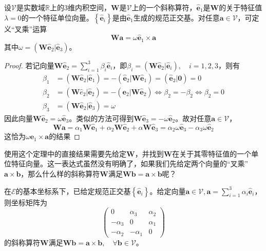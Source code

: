 \documentclass[main.tex]{subfiles}
\begin{document}
\begin{theorem}
    设$\mathcal{V}$是实数域$\mathbb{R}$上的3维内积空间，$\mathbf{W}$是$\mathcal{V}$上的一个斜称算符，$\mathbf{\hat{e}}_1$是$\mathbf{W}$的关于特征值$\lambda=0$的一个特征单位向量。$\left\{\mathbf{\hat{e}}_i\right\}$是由$\mathbf{\hat{e}}_1$生成的规范正交基。对任意$\mathbf{a}\in\mathcal{V}$，可定义“叉乘”运算
    \[\mathbf{Wa}=\omega\mathbf{\hat{e}}_1\times\mathbf{a}\]
    其中$\omega=\left(\mathbf{W\hat{e}}_2|\mathbf{\hat{e}}_3\right)$。
\end{theorem}
\begin{proof}
    若记向量$\mathbf{W\hat{e}}_2=\sum_{i=1}^3\beta_i\mathbf{\hat{e}}_i$，即$\beta_i=\left(\mathbf{W\hat{e}}_2|\mathbf{\hat{e}}_i\right),\quad i=1,2,3$，则有
    \begin{align*}
        \beta_1 & =\left(\mathbf{W\hat{e}}_2|\mathbf{\hat{e}}_1\right)=-\left(\mathbf{\hat{e}}_2|\mathbf{W\hat{e}}_1\right)=\left(\mathbf{\hat{e}}_2|\mathbf{0}\right)=0     \\
        \beta_2 & =\left(\mathbf{W}\hat{e}_2|\mathbf{\hat{e}}_2\right)=-\left(\mathbf{e}_2|\mathbf{W\hat{e}}_2\right)\Leftrightarrow\beta_2=-\beta_2\Leftrightarrow\beta_2=0 \\
        \beta_3 & =\left(\mathbf{W\hat{e}}_2|\mathbf{\hat{e}}_3\right)=\omega
    \end{align*}
    因此向量$\mathbf{W\hat{e}}_2=\omega\mathbf{\hat{e}}_3$。类似的方法可得到$\mathbf{W\hat{e}}_3=-\omega\mathbf{\hat{e}}_2$。故对任意$\mathbf{a}\in\mathcal{V}$，
    \[
        \mathbf{Wa}=\alpha_1\mathbf{W\hat{e}}_1+\alpha_2\mathbf{W\hat{e}}_2+\alpha\mathbf{W\hat{e}}_3=\alpha_2\omega\mathbf{\hat{e}}_3-\alpha_3\omega\mathbf{\hat{e}}_2
    \]
    这恰为$\omega\mathbf{e}_1\times\mathbf{a}$的结果
\end{proof}
使用这个定理中的直接结果需要先给定$\mathbf{W}$，并找到$\mathbf{W}$在关于其零特征值的一个单位特征向量。这一表达式虽然没有明确了，如果我们先给定两个向量的“叉乘”$\mathbf{a}\times\mathbf{b}$，那么什么样的斜称算符$\mathbf{W}$满足$\mathbf{Wb}=\mathbf{a}\times\mathbf{b}$呢？

\begin{corollary}
    在$\mathcal{E}$的基本坐标系下，已给定规范正交基$\left\{\mathbf{\hat{e}}_i\right\}$。给定向量$\mathbf{a}\in\mathcal{V},\mathbf{a}=\sum_{i=1}^3\alpha_i\mathbf{\hat{e}}_i$，则坐标矩阵为
    \[\left(\begin{array}{ccc}0&\alpha_3&\alpha_2\\-\alpha_3&0&\alpha_1\\-\alpha_2&-\alpha_1&0\end{array}\right)\]
    的斜称算符$\mathbf{W}$满足$\mathbf{Wb}=\mathbf{a}\times\mathbf{b},\quad\forall\mathbf{b}\in\mathcal{V}$。
\end{corollary}
\end{document}
